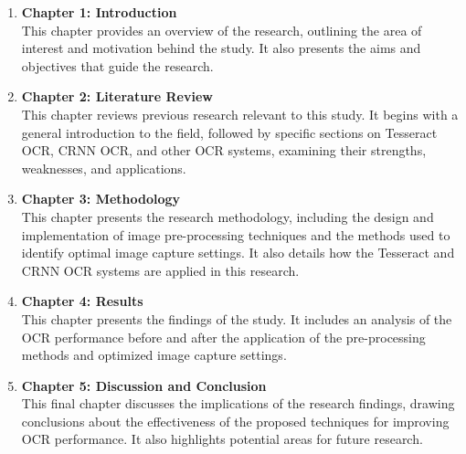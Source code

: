 \begin{enumerate}
      \item \textbf{Chapter 1: Introduction}\\
            This chapter provides an overview of the research, outlining the area of interest and motivation behind the study. It also presents the aims and objectives that guide the research.

      \item \textbf{Chapter 2: Literature Review}\\
            This chapter reviews previous research relevant to this study. It begins with a general introduction to the field, followed by specific sections on Tesseract OCR, CRNN OCR, and other OCR systems, examining their strengths, weaknesses, and applications.

      \item \textbf{Chapter 3: Methodology}\\
            This chapter presents the research methodology, including the design and implementation of image pre-processing techniques and the methods used to identify optimal image capture settings. It also details how the Tesseract and CRNN OCR systems are applied in this research.

      \item \textbf{Chapter 4: Results}\\
            This chapter presents the findings of the study. It includes an analysis of the OCR performance before and after the application of the pre-processing methods and optimized image capture settings.

      \item \textbf{Chapter 5: Discussion and Conclusion}\\
            This final chapter discusses the implications of the research findings, drawing conclusions about the effectiveness of the proposed techniques for improving OCR performance. It also highlights potential areas for future research.
\end{enumerate}


